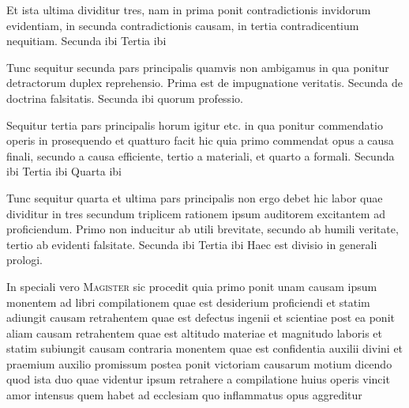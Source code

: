 \documentclass[twoside, openright]{article}
\newcommand{\name}[1]{\textsc{#1}}
\begin{document}
        \pstart
        Et ista ultima dividitur tres, nam in prima ponit contradictionis invidorum evidentiam, in secunda contradictionis causam, in tertia contradicentium nequitiam. Secunda ibi  Tertia ibi  
        \pend
     
        \pstart
        Tunc sequitur secunda pars principalis quamvis non ambigamus in qua ponitur detractorum duplex reprehensio. Prima est de impugnatione veritatis. Secunda de doctrina falsitatis. Secunda ibi quorum professio.
        \pend
     
        \pstart
        Sequitur tertia pars principalis horum igitur etc. in qua ponitur commendatio operis in prosequendo et quatturo facit hic quia primo commendat opus a causa finali, secundo a causa efficiente, tertio a materiali, et quarto a formali. Secunda ibi   Tertia ibi  Quarta ibi  
        \pend
     
        \pstart
        Tunc sequitur quarta et ultima pars principalis non ergo debet hic labor quae dividitur in tres secundum triplicem rationem ipsum auditorem excitantem ad proficiendum. Primo non inducitur ab utili brevitate, secundo ab humili veritate, tertio ab evidenti falsitate. Secunda ibi  Tertia ibi  Haec est divisio in generali prologi.
        \pend
     
        \pstart
        In speciali vero \name{Magister} sic procedit quia primo ponit unam causam ipsum monentem ad libri compilationem quae est desiderium proficiendi et statim adiungit causam retrahentem quae est defectus ingenii et scientiae post ea ponit aliam causam retrahentem quae est altitudo materiae et magnitudo laboris et statim subiungit causam contraria monentem quae est confidentia auxilii divini et praemium auxilio promissum postea ponit victoriam causarum motium dicendo quod ista duo quae videntur ipsum retrahere a compilatione huius operis vincit amor intensus quem habet ad ecclesiam quo inflammatus opus aggreditur
        \pend
     
\end{document}
